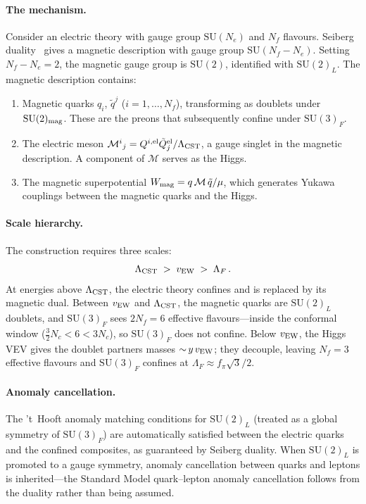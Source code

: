 \documentclass[12pt,a4paper]{article}
\newcommand{\SU}{\mathrm{SU}}
\newcommand{\Nf}{N_f}
\newcommand{\Nc}{N_c}
\begin{document}
\paragraph{The mechanism.}
Consider an electric theory with gauge group $\SU(N_e)$ and $\Nf$
flavours.  Seiberg duality~\cite{Seiberg:1994bz} gives a magnetic
description with gauge group $\SU(\Nf - N_e)$.  Setting
$\Nf - N_e = 2$, the magnetic gauge group is $\SU(2)$, identified
with $\SU(2)_L$.  The magnetic description contains:
\begin{enumerate}
  \item Magnetic quarks $q_i$, $\tilde{q}^j$ ($i = 1,\ldots,\Nf$),
    transforming as doublets under $\SU(2)_{\rm mag}$.  These are the
    preons that subsequently confine under $\SU(3)_F$.
  \item The electric meson $\mathcal{M}^i{}_j =
    Q^{i,\rm el}\tilde{Q}^{\rm el}_j / \Lambda_{\rm CST}$,
    a gauge singlet in the magnetic description.  A component of
    $\mathcal{M}$ serves as the Higgs.
  \item The magnetic superpotential
    $W_{\rm mag} = q\,\mathcal{M}\,\tilde{q}/\mu$, which generates
    Yukawa couplings between the magnetic quarks and the Higgs.
\end{enumerate}

\paragraph{Scale hierarchy.}
The construction requires three scales:
\begin{equation}
  \Lambda_{\rm CST} \;>\; v_{\rm EW} \;>\; \Lambda_F\,.
  \label{eq:cst_scales}
\end{equation}
At energies above $\Lambda_{\rm CST}$, the electric theory confines
and is replaced by its magnetic dual.  Between $v_{\rm EW}$ and
$\Lambda_{\rm CST}$, the magnetic quarks are $\SU(2)_L$ doublets,
and $\SU(3)_F$ sees $2\Nf = 6$ effective flavours---inside the
conformal window ($\frac{3}{2}\Nc < 6 < 3\Nc$), so
$\SU(3)_F$ does not confine.  Below $v_{\rm EW}$, the Higgs VEV
gives the doublet partners masses ${\sim}\,y\,v_{\rm EW}$; they
decouple, leaving $\Nf = 3$ effective flavours and $\SU(3)_F$
confines at $\Lambda_F \approx f_\pi\sqrt{3}/2$.

\paragraph{Anomaly cancellation.}
The 't~Hooft anomaly matching conditions for $\SU(2)_L$ (treated as
a global symmetry of $\SU(3)_F$) are automatically satisfied between
the electric quarks and the confined composites, as guaranteed by
Seiberg duality.  When $\SU(2)_L$ is promoted to a gauge symmetry,
anomaly cancellation between quarks and leptons is
inherited---the Standard Model quark--lepton anomaly cancellation
follows from the duality rather than being assumed.
\end{document}
